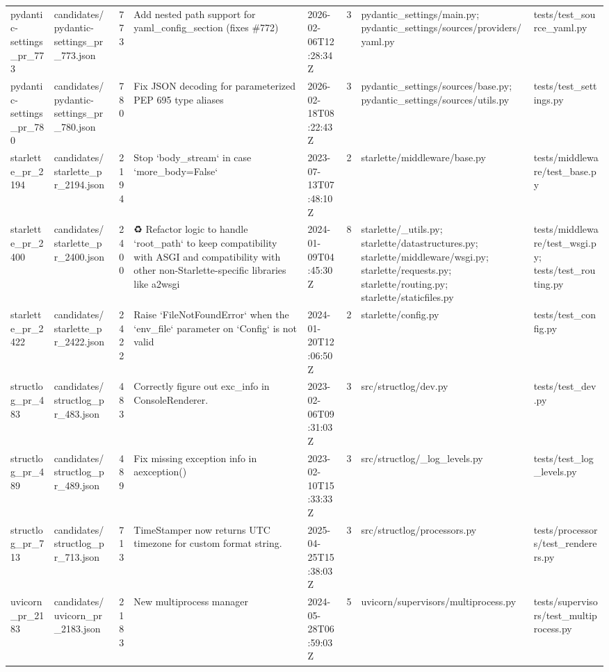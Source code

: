 \begin{tabular}{llrllrll}
pydantic-settings\_pr\_773 & candidates/pydantic-settings\_pr\_773.json & 773 & Add nested path support for yaml\_config\_section (fixes \#772) & 2026-02-06T12:28:34Z & 3 & pydantic\_settings/main.py; pydantic\_settings/sources/providers/yaml.py & tests/test\_source\_yaml.py \\
pydantic-settings\_pr\_780 & candidates/pydantic-settings\_pr\_780.json & 780 & Fix JSON decoding for parameterized PEP 695 type aliases & 2026-02-18T08:22:43Z & 3 & pydantic\_settings/sources/base.py; pydantic\_settings/sources/utils.py & tests/test\_settings.py \\
starlette\_pr\_2194 & candidates/starlette\_pr\_2194.json & 2194 & Stop `body\_stream` in case `more\_body=False` & 2023-07-13T07:48:10Z & 2 & starlette/middleware/base.py & tests/middleware/test\_base.py \\
starlette\_pr\_2400 & candidates/starlette\_pr\_2400.json & 2400 & ♻️ Refactor logic to handle `root\_path` to keep compatibility with ASGI and compatibility with other non-Starlette-specific libraries like a2wsgi & 2024-01-09T04:45:30Z & 8 & starlette/\_utils.py; starlette/datastructures.py; starlette/middleware/wsgi.py; starlette/requests.py; starlette/routing.py; starlette/staticfiles.py & tests/middleware/test\_wsgi.py; tests/test\_routing.py \\
starlette\_pr\_2422 & candidates/starlette\_pr\_2422.json & 2422 & Raise `FileNotFoundError` when the `env\_file` parameter on `Config` is not valid & 2024-01-20T12:06:50Z & 2 & starlette/config.py & tests/test\_config.py \\
structlog\_pr\_483 & candidates/structlog\_pr\_483.json & 483 & Correctly figure out exc\_info in ConsoleRenderer. & 2023-02-06T09:31:03Z & 3 & src/structlog/dev.py & tests/test\_dev.py \\
structlog\_pr\_489 & candidates/structlog\_pr\_489.json & 489 & Fix missing exception info in aexception() & 2023-02-10T15:33:33Z & 3 & src/structlog/\_log\_levels.py & tests/test\_log\_levels.py \\
structlog\_pr\_713 & candidates/structlog\_pr\_713.json & 713 & TimeStamper now returns UTC timezone for custom format string. & 2025-04-25T15:38:03Z & 3 & src/structlog/processors.py & tests/processors/test\_renderers.py \\
uvicorn\_pr\_2183 & candidates/uvicorn\_pr\_2183.json & 2183 & New multiprocess manager & 2024-05-28T06:59:03Z & 5 & uvicorn/supervisors/multiprocess.py & tests/supervisors/test\_multiprocess.py \\

\end{tabular}
